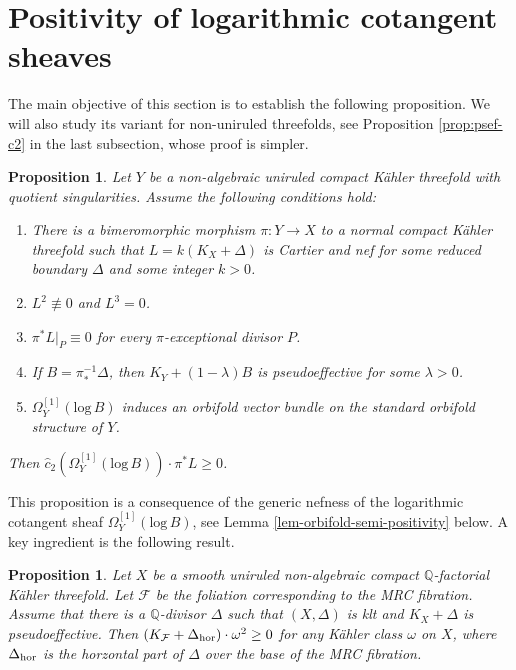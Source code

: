 \documentclass[12pt]{amsart}
\newcommand{\mbQ}{\mathbb{Q}}
\newcommand{\<}{\leq}
\def\>{\geq}
\newcommand{\D}{\Delta}
\def\mcF{\mathcal{F}}
\newtheorem{proposition}[theorem]{Proposition}
\theoremstyle{remark}
\theoremstyle{definition}
\theoremstyle{definition}
\numberwithin{equation}{section}
\theoremstyle{definition}
\theoremstyle{definition}
\begin{document}
\section{Positivity of logarithmic cotangent sheaves}
\label{section:log-cotan}

The main objective of this section is to establish the following proposition. 
We will also study its variant for non-uniruled threefolds, 
see Proposition \ref{prop:psef-c2} in the last subsection, whose proof is simpler.     

\begin{proposition}
\label{prop-log-orbifold-c2-semipositive}
Let $Y$ be a  non-algebraic uniruled compact K\"ahler threefold with quotient singularities.  
Assume the following conditions hold:
\begin{enumerate}
    \item There is a bimeromorphic morphism $\pi\colon Y \to X$ to a normal compact K\"ahler threefold  such that $L=k(K_X+\D)$ is Cartier and nef for some  reduced boundary $\D$ and some integer $k>0$.  
    \item $L^2\not\equiv 0$ and $L^3 = 0$. 
    \item  $\pi^*L|_P \equiv 0$ for every $\pi$-exceptional divisor $P$. 
    \item If $B = \pi^{-1}_*\D$, then $K_Y+(1-\lambda)B$ is pseudoeffective for some $\lambda >0$.
    \item $\Omega_Y^{[1]}(\mathrm{log}\,  B)$ induces an orbifold vector bundle on the standard orbifold structure of $Y$. 
\end{enumerate}    
Then  $\hat{c}_2(\Omega_Y^{[1]}(\mathrm{log}\,  B)) \cdot  \pi^*L \> 0$.   
\end{proposition}
 
This proposition is a consequence of the generic nefness of the logarithmic cotangent sheaf  $\Omega_{Y}^{[1]}(\mathrm{log}\, B)$, see Lemma \ref{lem-orbifold-semi-positivity} below.  
A key ingredient is the following result. 


\begin{proposition}
\label{prop-effective-adjoint-foliation-canonical}
Let $X$ be a smooth uniruled non-algebraic   compact  $\mathbb{Q}$-factorial K\"ahler threefold. 
Let $\mcF$ be the foliation corresponding to the MRC fibration.   
Assume that there is a $\mbQ$-divisor $\D$  such that $(X,\D)$ is klt  and  $K_X+\D$  is pseudoeffective.  
Then   $(K_{\mcF}+\D_{\rm hor}) \cdot \omega^{2} \> 0$ for any K\"ahler class $\omega$ on $X$, where $\D_{\rm hor}$ is the horzontal part of $\D$ over the base of the MRC fibration.  
\end{proposition}
\end{document}
